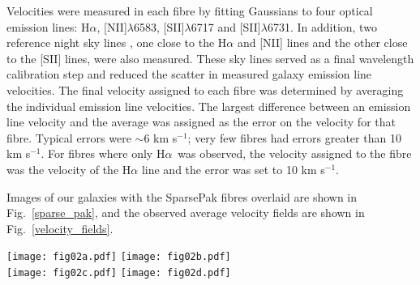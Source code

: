 \documentclass[a4paper,fleqn,usenatbib]{mnras}
\begin{document}
Velocities were measured in each fibre by fitting Gaussians to four optical emission lines: H$\alpha$, [NII]$\lambda$6583, [SII]$\lambda$6717 and [SII]$\lambda$6731. In addition, two reference night sky lines \citep{osterbrock1996}, one close to the H$\alpha$ and [NII] lines and the other close to the [SII] lines, were also measured. These sky lines served as a final wavelength calibration step and reduced the scatter in measured galaxy emission line velocities. The final velocity assigned to each fibre was determined by averaging  the individual emission line velocities. The largest difference between an emission line velocity and the average was assigned as the error on the velocity for that fibre. Typical errors were $\sim$6 km s$^{-1}$; very few fibres had errors greater than 10 km s$^{-1}$. For fibres where only H$\alpha$\ was observed, the velocity assigned to the fibre was the velocity of the H$\alpha$ line and the error was set to 10 km s$^{-1}$.

Images of our galaxies with the SparsePak fibres overlaid are shown in Fig.~\ref{sparse_pak}, and the  observed average velocity fields are shown in Fig.~\ref{velocity_fields}.

\begin{figure*}
	\center
   	\texttt{[image: fig02a.pdf]} \hskip 2mm \texttt{[image: fig02b.pdf]}\\
	\vskip 2mm
    	\texttt{[image: fig02c.pdf]} \hskip 2mm \texttt{[image: fig02d.pdf]}
  	\caption{Position of SparsePak array over our four galaxies. Each fibre is 5$\arcsec$ in diameter. Images are taken from SAO Digital Sky Survey. \textit{Top Left}: NGC~2654.  There were three pointings of the array, dithered such that gaps between fibres would be filled. Image is 3$\arcmin$~$\times$~3$\arcmin$. \textit{Top Right}: NGC~2841. There were three pointings of the array, offset to cover the length of the galaxy. Image is 5$\arcmin$~$\times$~5$\arcmin$. \textit{Bottom Left}: NGC~5746. The three pointings were offset from each other to cover the length of the galaxy. Image is 5$\arcmin$~$\times$~5$\arcmin$. \textit{Bottom Right}: NGC~6674. The three pointings were offset from each other to cover the length of the galaxy and the array is rotated to align the central diamond of fibres with the bar. Image is 5$\arcmin$~$\times$~5$\arcmin$.}
	\label{sparse_pak}
\end{figure*}
\end{document}
